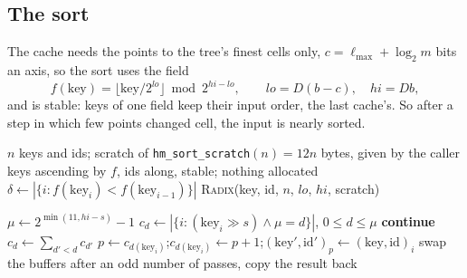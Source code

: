 \documentclass[10pt,a4paper]{article}
\theoremstyle{definition}
\newcommand{\fn}[1]{\texttt{#1}}
\begin{document}
\subsection{The sort}

The cache needs the points to the tree's finest cells only, $c = \ell_{\max}
+ \log_2 m$ bits an axis, so the sort uses the field
\[
  f(\mathrm{key}) = \big\lfloor \mathrm{key} / 2^{lo} \big\rfloor \bmod
    2^{hi - lo}, \qquad lo = D (b - c), \quad hi = D b,
\]
and is stable: keys of one field keep their input order, the last cache's.
So after a step in which few points changed cell, the input is nearly
sorted.

\begin{algorithm}[H]
  \caption{\fn{hm\_sort\_keys (key, id, n, lo, hi, scratch)}}
  \label{alg:sort}
  \begin{algorithmic}[1]
    \Require $n$ keys and ids; scratch of \fn{hm\_sort\_scratch}$(n) = 12 n$
      bytes, given by the caller
    \Ensure keys ascending by $f$, ids along, stable; nothing allocated
    \State $\delta \gets |\{ i : f(\mathrm{key}_i) < f(\mathrm{key}_{i-1})
      \}|$ 
     \Return {}
    \EndIf
     \Return {}
    \EndIf
    \State \textsc{Radix}(key, id, $n$, $lo$, $hi$, scratch)
  \end{algorithmic}
\end{algorithm}

\begin{algorithm}[H]
  \caption{\textsc{Radix}: least significant digit first, 11 bits a digit}
  \label{alg:radix}
  \begin{algorithmic}[1]
      \State $\mu \gets 2^{\min(11, hi - s)} - 1$ 
      \State $c_d \gets |\{ i : (\mathrm{key}_i \gg s) \wedge \mu = d \}|$,
        $0 \le d \le \mu$ 
       \textbf{continue} 
      \EndIf
      \State $c_d \gets \sum_{d' < d} c_{d'}$ 
       
        \State $p \gets c_{d(\mathrm{key}_i)}$;\quad $c_{d(\mathrm{key}_i)}
          \gets p + 1$;\quad $(\mathrm{key}', \mathrm{id}')_p \gets
          (\mathrm{key}, \mathrm{id})_i$
      \EndFor
      \State swap the buffers 
    \EndFor
    \State after an odd number of passes, copy the result back
  \end{algorithmic}
\end{algorithm}
\end{document}
